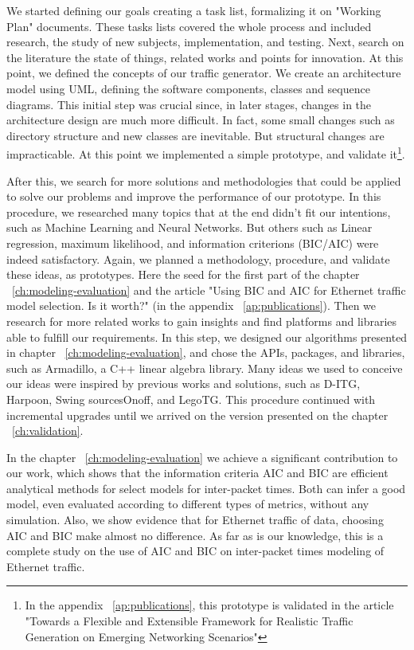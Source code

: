 We started defining our goals creating a task list, formalizing it on "Working Plan" documents. These tasks lists covered the whole process and included research, the study of new subjects, implementation, and testing. Next, search on the literature the state of things, related works and points for innovation. At this point, we defined the concepts of our traffic generator. We create an architecture model using UML, defining the software components, classes and sequence diagrams. This initial step was crucial since, in later stages, changes in the architecture design are much more difficult. In fact, some small changes such as directory structure and new classes are inevitable. But structural changes are impracticable. At this point we implemented a simple prototype, and validate it\footnote{In the appendix ~\ref{ap:publications}, this prototype is validated in the article "Towards a Flexible and Extensible Framework for Realistic Traffic Generation on Emerging Networking Scenarios"}. 


After this, we search for more solutions and methodologies that could be applied to solve our problems and improve the performance of our prototype. In this procedure, we researched many topics that at the end didn't fit our intentions, such as Machine Learning and Neural Networks. But others such as Linear regression, maximum likelihood, and information criterions (BIC/AIC) were indeed satisfactory. Again, we planned a methodology, procedure, and validate these ideas, as prototypes. Here the seed for the first part of the chapter ~\ref{ch:modeling-evaluation} and the article "Using BIC and AIC for Ethernet traffic model selection. Is it worth?" (in the appendix ~\ref{ap:publications}). Then we research for more related works to gain insights and find platforms and libraries able to fulfill our requirements. In this step, we designed our algorithms presented in chapter ~\ref{ch:modeling-evaluation}, and chose the APIs, packages, and libraries, such as Armadillo\cite{armadillo}, a C++ linear algebra library. Many ideas we used to conceive our ideas were inspired by previous works and solutions, such as D-ITG\cite{ditg-paper}, Harpoon\cite{harpoon-validation}, Swing\cite{swing-paper} sourcesOnoff\cite{sourcesonoff-paper}, and LegoTG\cite{legotg-paper}. This procedure continued with incremental upgrades until we arrived on the version presented on the chapter ~\ref{ch:validation}. 


In the chapter ~\ref{ch:modeling-evaluation} we achieve a significant contribution to our work, which shows that the information criteria AIC and BIC are efficient analytical methods for select models for inter-packet times. Both can infer a good model, even evaluated according to different types of metrics, without any simulation. Also, we show evidence that for Ethernet traffic of data, choosing AIC and BIC make almost no difference. As far as is our knowledge, this is a complete study on the use of AIC and BIC on inter-packet times modeling of Ethernet traffic.


